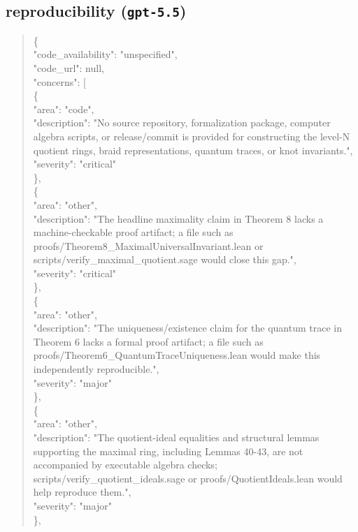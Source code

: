 \documentclass[11pt]{article}
\begin{document}
\subsection*{reproducibility (\texttt{gpt-5.5})}
\begin{quote}\small\ttfamily\raggedright
\{\\
  "code\_availability": "unspecified",\\
  "code\_url": null,\\
  "concerns": [\\
    \{\\
      "area": "code",\\
      "description": "No source repository, formalization package, computer algebra scripts, or release/commit is provided for constructing the level-N quotient rings, braid representations, quantum traces, or knot invariants.",\\
      "severity": "critical"\\
    \},\\
    \{\\
      "area": "other",\\
      "description": "The headline maximality claim in Theorem 8 lacks a machine-checkable proof artifact; a file such as proofs/Theorem8\_MaximalUniversalInvariant.lean or scripts/verify\_maximal\_quotient.sage would close this gap.",\\
      "severity": "critical"\\
    \},\\
    \{\\
      "area": "other",\\
      "description": "The uniqueness/existence claim for the quantum trace in Theorem 6 lacks a formal proof artifact; a file such as proofs/Theorem6\_QuantumTraceUniqueness.lean would make this independently reproducible.",\\
      "severity": "major"\\
    \},\\
    \{\\
      "area": "other",\\
      "description": "The quotient-ideal equalities and structural lemmas supporting the maximal ring, including Lemmas 40-43, are not accompanied by executable algebra checks; scripts/verify\_quotient\_ideals.sage or proofs/QuotientIdeals.lean would help reproduce them.",\\
      "severity": "major"\\
    \},\\

\end{quote}
\end{document}
